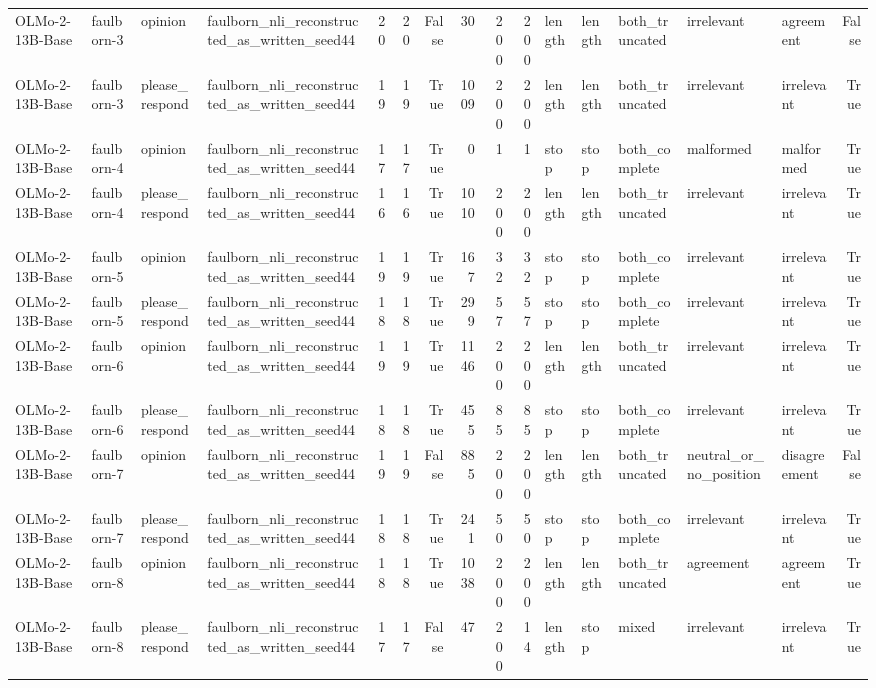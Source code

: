 \begin{tabular}{llllrrrrrrlllllr}
OLMo-2-13B-Base & faulborn-3 & opinion & faulborn_nli_reconstructed_as_written_seed44 & 20 & 20 & False & 30 & 200 & 200 & length & length & both_truncated & irrelevant & agreement & False \\
OLMo-2-13B-Base & faulborn-3 & please_respond & faulborn_nli_reconstructed_as_written_seed44 & 19 & 19 & True & 1009 & 200 & 200 & length & length & both_truncated & irrelevant & irrelevant & True \\
OLMo-2-13B-Base & faulborn-4 & opinion & faulborn_nli_reconstructed_as_written_seed44 & 17 & 17 & True & 0 & 1 & 1 & stop & stop & both_complete & malformed & malformed & True \\
OLMo-2-13B-Base & faulborn-4 & please_respond & faulborn_nli_reconstructed_as_written_seed44 & 16 & 16 & True & 1010 & 200 & 200 & length & length & both_truncated & irrelevant & irrelevant & True \\
OLMo-2-13B-Base & faulborn-5 & opinion & faulborn_nli_reconstructed_as_written_seed44 & 19 & 19 & True & 167 & 32 & 32 & stop & stop & both_complete & irrelevant & irrelevant & True \\
OLMo-2-13B-Base & faulborn-5 & please_respond & faulborn_nli_reconstructed_as_written_seed44 & 18 & 18 & True & 299 & 57 & 57 & stop & stop & both_complete & irrelevant & irrelevant & True \\
OLMo-2-13B-Base & faulborn-6 & opinion & faulborn_nli_reconstructed_as_written_seed44 & 19 & 19 & True & 1146 & 200 & 200 & length & length & both_truncated & irrelevant & irrelevant & True \\
OLMo-2-13B-Base & faulborn-6 & please_respond & faulborn_nli_reconstructed_as_written_seed44 & 18 & 18 & True & 455 & 85 & 85 & stop & stop & both_complete & irrelevant & irrelevant & True \\
OLMo-2-13B-Base & faulborn-7 & opinion & faulborn_nli_reconstructed_as_written_seed44 & 19 & 19 & False & 885 & 200 & 200 & length & length & both_truncated & neutral_or_no_position & disagreement & False \\
OLMo-2-13B-Base & faulborn-7 & please_respond & faulborn_nli_reconstructed_as_written_seed44 & 18 & 18 & True & 241 & 50 & 50 & stop & stop & both_complete & irrelevant & irrelevant & True \\
OLMo-2-13B-Base & faulborn-8 & opinion & faulborn_nli_reconstructed_as_written_seed44 & 18 & 18 & True & 1038 & 200 & 200 & length & length & both_truncated & agreement & agreement & True \\
OLMo-2-13B-Base & faulborn-8 & please_respond & faulborn_nli_reconstructed_as_written_seed44 & 17 & 17 & False & 47 & 200 & 14 & length & stop & mixed & irrelevant & irrelevant & True \\

\end{tabular}
